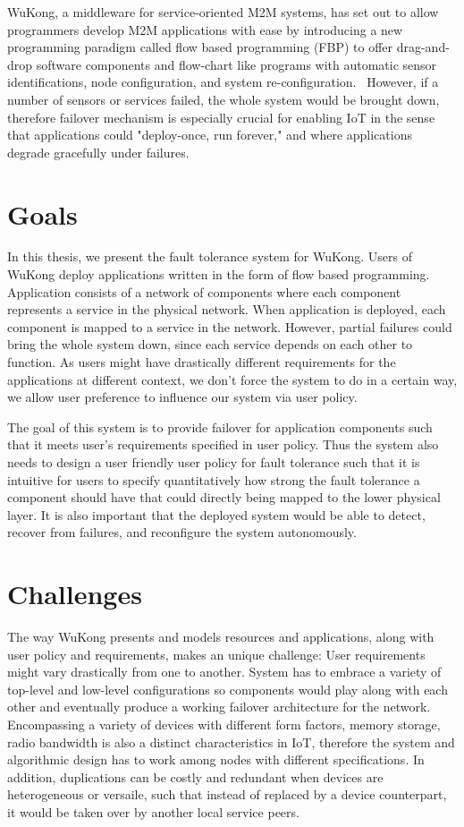WuKong, a middleware for service-oriented M2M systems, has set out to allow
programmers develop M2M applications with ease by introducing a new
programming paradigm called flow based programming (FBP) to offer drag-and-drop
software components and flow-chart like programs with automatic sensor
identifications, node configuration, and system re-configuration.~\cite{Reijers}
However, if a number of sensors or services failed, the whole system would be
brought down, therefore failover mechanism is especially crucial for enabling
IoT in the sense that applications could "deploy-once, run forever," and where
applications degrade gracefully under failures.


\section{Goals} %

In this thesis, we present the fault tolerance system for WuKong.
Users of WuKong deploy applications written in the form of flow based
programming. Application consists of a network of components where each
component represents a service in the physical network. When application is deployed, each
component is mapped to a service in the network. However, partial failures could
bring the whole system down, since each service depends on each other to
function. As users might have drastically different requirements for the
applications at different context, we don't force the system to do in a certain way, we allow user
preference to influence our system via user policy.

The goal of this system is to provide failover for application components such
that it meets user's requirements specified in user policy. Thus the system also
needs to design a user friendly user policy for fault tolerance such that it is
intuitive for users to specify quantitatively how strong the fault tolerance
a component should have that could directly being mapped to the lower physical
layer. It is also important that the deployed system would be
able to detect, recover from failures, and reconfigure the system autonomously. 


\section{Challenges}

The way WuKong presents and models resources and applications, along with user
policy and requirements, makes an unique challenge: User requirements might
vary drastically from one to another. System has to embrace a variety of
top-level and low-level configurations so components would play along with each
other and eventually produce a working failover architecture for the network.
Encompassing a variety of devices with different form factors, memory storage,
radio bandwidth is also a distinct characteristics in IoT,
therefore the system and algorithmic design has to work among nodes
with different specifications. In addition, duplications can be
costly and redundant when devices are heterogeneous or versaile,
such that instead of replaced by a device counterpart, it would be
taken over by another local service peers.

